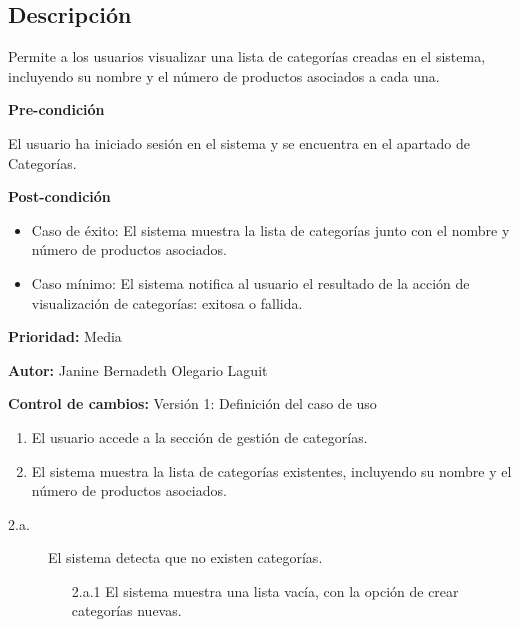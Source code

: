 
\subsection*{Descripción}
Permite a los usuarios visualizar una lista de categorías creadas en el sistema, incluyendo su nombre y el número de productos asociados a cada una.\par
\vspace{0.15cm}

\textbf{Pre-condición}\par
El usuario ha iniciado sesión en el sistema y se encuentra en el apartado de Categorías.\par
\vspace{0.15cm}

\textbf{Post-condición}
\begin{itemize}
    \item Caso de éxito: El sistema muestra la lista de categorías junto con el nombre y número de productos asociados.
    \item Caso mínimo: El sistema notifica al usuario el resultado de la acción de visualización de categorías: exitosa o fallida.
\end{itemize}

\textbf{Prioridad: }
Media
\vspace{0.15cm}

\textbf{Autor: }
Janine Bernadeth Olegario Laguit\par
\vspace{0.15cm}

\textbf{Control de cambios: } Versión 1: Definición del caso de uso

\begin{enumerate}
    \item El usuario accede a la sección de gestión de categorías.
    \item El sistema muestra la lista de categorías existentes, incluyendo su nombre y el número de productos asociados.
\end{enumerate}

\begin{description}
    \item[2.a.] El sistema detecta que no existen categorías.
    \begin{enumerate}
        \item[2.a.1] El sistema muestra una lista vacía, con la opción de crear categorías nuevas.
    \end{enumerate}

\end{description}

